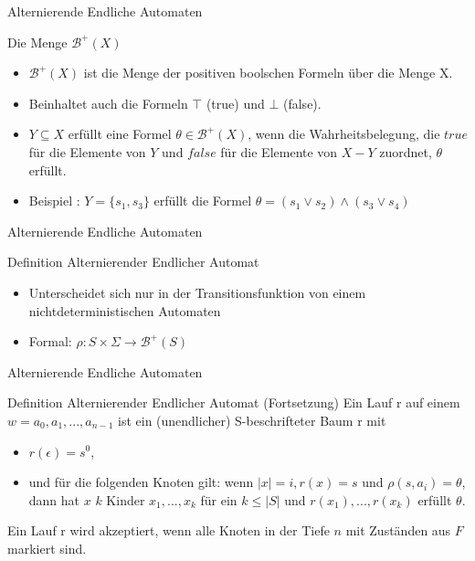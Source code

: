 \begin{frame}{Alternierende Endliche Automaten}
\begin{block}{Die Menge $\mathcal{B}^+(X)$}
\begin{itemize}
\setlength\itemsep{1em}
\item $\mathcal{B}^+(X)$ ist die Menge der positiven boolschen Formeln über die Menge X.
\item Beinhaltet auch die Formeln $\top$ (true) und $\bot$ (false).
\pause
\item $Y \subseteq X$ erfüllt eine Formel $\theta \in \mathcal{B}^+(X)$, wenn die Wahrheitsbelegung, die $true$ für die Elemente von $Y$ und $false$ für die Elemente von $X-Y$ zuordnet, $\theta$ erfüllt.
\pause
\item Beispiel \cite{vardi+96}: $Y=\{s_1,s_3\}$ erfüllt die Formel $\theta = (s_1 \vee s_2)\wedge (s_3\vee s_4)$\\
\end{itemize}
\end{block}
\end{frame}

\begin{frame}{Alternierende Endliche Automaten}
\begin{block}{Definition Alternierender Endlicher Automat}
\begin{itemize}
\setlength\itemsep{1em}
\item Unterscheidet sich nur in der Transitionsfunktion von einem nichtdeterministischen Automaten
\item Formal: $\rho: S\times \Sigma \rightarrow \mathcal{B}^+(S)$
\end{itemize}
\end{block}
\end{frame}

\begin{frame}{Alternierende Endliche Automaten}
\begin{block}{Definition Alternierender Endlicher Automat (Fortsetzung)}
Ein Lauf r auf einem $w=a_0,a_1,...,a_{n-1}$ ist ein (unendlicher) S-beschrifteter Baum r mit
\begin{itemize}
\setlength\itemsep{1em}
\item $r(\epsilon)=s^0$,
\pause
\item und für die folgenden Knoten gilt: wenn $|x|=i, r(x)=s$ und $\rho(s,a_i)=\theta$, dann hat $x$ $k$ Kinder $x_1,...,x_k$ für ein $k \leq |S|$ und $r(x_1),...,r(x_k)$ erfüllt $\theta$.
\end{itemize}
\pause
\vspace{1em}
Ein Lauf r wird akzeptiert, wenn alle Knoten in der Tiefe $n$ mit Zuständen aus $F$ markiert sind.
\end{block}
\end{frame}


